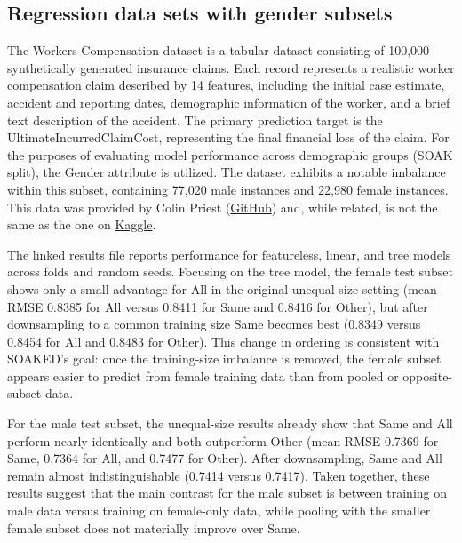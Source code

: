 \documentclass{article}
\begin{document}
\subsection{Regression data sets with gender subsets}
The Workers Compensation dataset \cite{Ali2020} is a tabular dataset consisting of 100,000 synthetically generated insurance claims. 
Each record represents a realistic worker compensation claim described by 14 features, including the initial case estimate, accident and reporting dates, demographic information of the worker, and a brief text description of the accident. 
The primary prediction target is the UltimateIncurredClaimCost, representing the final financial loss of the claim. 
For the purposes of evaluating model performance across demographic groups (SOAK split), the Gender attribute is utilized. 
The dataset exhibits a notable imbalance within this subset, containing 77,020 male instances and 22,980 female instances. 
This data was provided by Colin Priest (\href{https://github.com/colinpriest}{GitHub}) and, while related, is not the same as the one on \href{https://www.kaggle.com/c/actuarial-loss-estimation}{Kaggle}.

The linked results file reports performance for featureless, linear, and tree models across folds and random seeds.
Focusing on the tree model, the female test subset shows only a small advantage for All in the original unequal-size setting (mean RMSE 0.8385 for All versus 0.8411 for Same and 0.8416 for Other), but after downsampling to a common training size Same becomes best (0.8349 versus 0.8454 for All and 0.8483 for Other).
This change in ordering is consistent with SOAKED's goal: once the training-size imbalance is removed, the female subset appears easier to predict from female training data than from pooled or opposite-subset data.

For the male test subset, the unequal-size results already show that Same and All perform nearly identically and both outperform Other (mean RMSE 0.7369 for Same, 0.7364 for All, and 0.7477 for Other).
After downsampling, Same and All remain almost indistinguishable (0.7414 versus 0.7417).
Taken together, these results suggest that the main contrast for the male subset is between training on male data versus training on female-only data, while pooling with the smaller female subset does not materially improve over Same.
\end{document}

